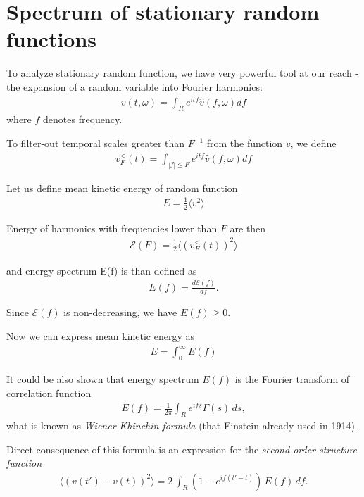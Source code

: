 {\section{Spectrum of stationary random functions}

To analyze stationary random function, we have very powerful tool at our reach - the expansion of a random variable into Fourier harmonics:
\begin{align}
v(t,\omega) = \int_{R} e^{itf} \hat{v}(f,\omega) df
\end{align}
where $f$ denotes frequency.

To filter-out temporal scales greater than $F^{-1}$ from the function $v$, we define
\begin{align}
v_F^{<}(t) = \int_{|f| \leq F} e^{itf} \hat{v}(f,\omega) df
\end{align} 

\bigskip

Let us define mean kinetic energy of random function 
\begin{align}
E = \frac{1}{2} \langle v^2 \rangle
\end{align}

Energy of harmonics with frequencies lower than $F$ are then
\begin{align}
\mathcal{E}(F) = \frac{1}{2} \langle (v_F^{<}(t))^2 \rangle
\end{align}

and energy spectrum E(f) is than defined as
\begin{align}
E(f) = \frac{d\mathcal{E}(f)}{df}.
\end{align}

Since $\mathcal{E}(f)$ is non-decreasing, we have $E(f) \geq 0$.

\bigskip

Now we can express mean kinetic energy as
\begin{align}
E = \int_0^{\infty} E(f)
\end{align}

It could be also shown that energy spectrum $E(f)$ is the Fourier transform of correlation function
\begin{align} 
E(f)  = \frac{1}{2\pi} \int_{R} e^{ifs} \Gamma(s) \,ds,
\end{align}
what is known as \textit{Wiener-Khinchin formula} (that Einstein already used in 1914).

Direct consequence of this formula is an expression for the \textit{second order structure function}
\begin{align}\label{structf}
\langle (v(t') - v(t))^2 \rangle = 2 \, \int_{R} (1 - e^{if(t' - t)}) \, E(f) \, df.
\end{align}

}
